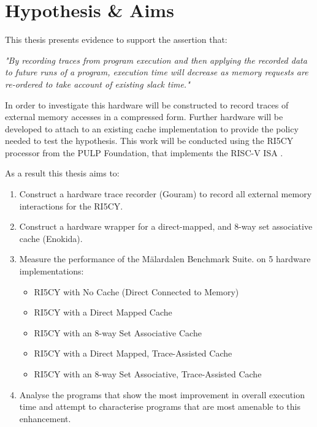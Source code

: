 
\section{Hypothesis \& Aims}

This thesis presents evidence to support the assertion that:

\emph{"By recording traces from program execution and then applying the recorded data to future runs of a program, execution time will decrease as memory requests are re-ordered to take account of existing slack time."}

In order to investigate this hardware will be constructed to record traces of external memory accesses in a compressed form. Further hardware will be developed to attach to an existing cache implementation to provide the policy needed to test the hypothesis. This work will be conducted using the RI5CY processor \cite{gautschiNearThresholdRISCVCore2017} from the PULP Foundation, that implements the RISC-V ISA \cite{watermanRISCVInstructionSet2019}.

As a result this thesis aims to:

\begin{enumerate}
	\item Construct a hardware trace recorder (Gouram) to record all external memory interactions for the RI5CY.
	\item Construct a hardware wrapper for a direct-mapped, and 8-way set associative cache (Enokida). 
	\item Measure the performance of the Mälardalen Benchmark Suite. \cite{gustafssonMalardalenWCETBenchmarks2010} on 5 hardware implementations:
	\begin{itemize}
		\item RI5CY with No Cache (Direct Connected to Memory)
		\item RI5CY with a Direct Mapped Cache
		\item RI5CY with an 8-way Set Associative Cache
		\item RI5CY with a Direct Mapped, Trace-Assisted Cache
		\item RI5CY with an 8-way Set Associative, Trace-Assisted Cache
	\end{itemize}
	\item Analyse the programs that show the most improvement in overall execution time and attempt to characterise programs that are most amenable to this enhancement.
\end{enumerate}

